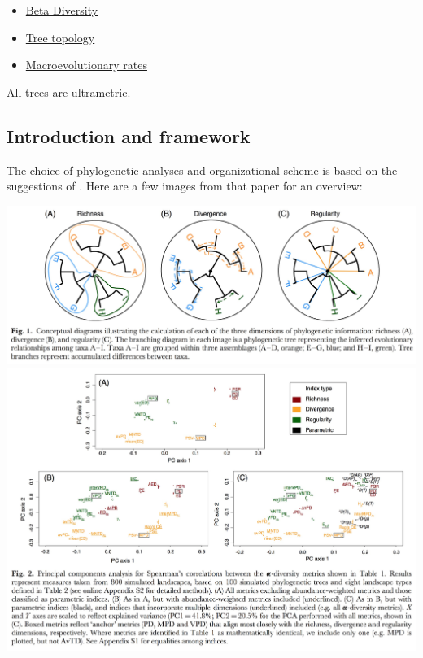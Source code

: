 \documentclass[]{book}
\providecommand{\tightlist}{%
  \setlength{\itemsep}{0pt}\setlength{\parskip}{0pt}}
\theoremstyle{definition}
\theoremstyle{definition}
\theoremstyle{remark}
\begin{document}
\begin{itemize}
\tightlist
\item
  \protect\hyperlink{beta-diversity}{Beta Diversity}
\item
  \protect\hyperlink{tree-topology}{Tree topology}
\item
  \protect\hyperlink{macroevolutionary-rates}{Macroevolutionary rates}
\end{itemize}

All trees are ultrametric.

\subsection{Introduction and
framework}\label{introduction-and-framework}

The choice of phylogenetic analyses and organizational scheme is based
on the suggestions of \citet{Tucker2016}. Here are a few images from
that paper for an overview:

\includegraphics{Images/Tucker_2016/tree_concept.jpg}
\includegraphics{Images/Tucker_2016/alpha_PCA.jpg}
\end{document}
